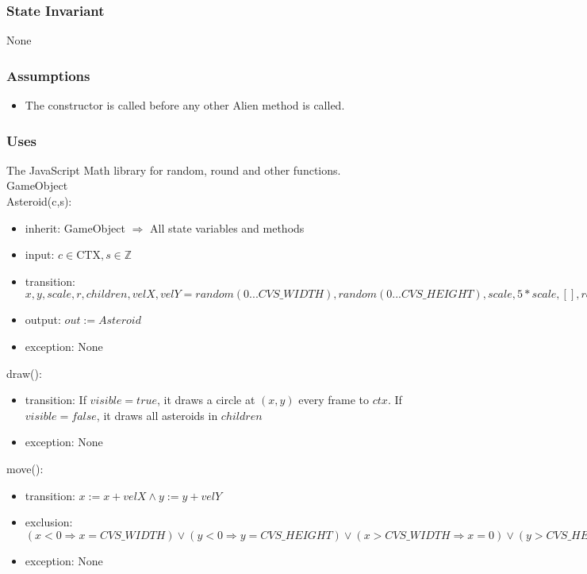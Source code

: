 \documentclass[12pt]{article}
\begin{document}
\subsubsection* {State Invariant}

None

\subsubsection* {Assumptions}

\begin{itemize}
  \item The constructor is called before any other Alien method is called.
\end{itemize}

\subsubsection*{Uses}

The JavaScript Math library for random, round and other functions.\\
GameObject\\

Asteroid(c,s):
\begin{itemize}
    \item inherit: GameObject $\Rightarrow$ All state variables and methods
    \item input: $c \in \mbox{CTX}, s \in \mathbb{Z}$
    \item transition: $ x, y, scale, r, children, velX, velY = random(0...CVS\_WIDTH), random(0...CVS\_HEIGHT), scale, 5*scale, [], random(-1...1) * 3, random(-1...1) * 3$
    \item output: $out := Asteroid$
    \item exception: None
\end{itemize}

\noindent draw():
\begin{itemize}
  \item transition: If $visible = true$, it draws a circle at $(x,y)$ every frame to $ctx$. If $visible = false$, it draws all asteroids in $children$
  \item exception: None
\end{itemize}

\noindent move():
\begin{itemize}
  \item transition: $x := x + velX \land y := y + velY$
  \item exclusion: $(x < 0 \Rightarrow x = CVS\_WIDTH) \lor (y < 0 \Rightarrow y = CVS\_HEIGHT) \lor (x > CVS\_WIDTH \Rightarrow x = 0) \lor (y > CVS\_HEIGHT \Rightarrow y = 0)$
  \item exception: None
\end{itemize}
\end{document}
